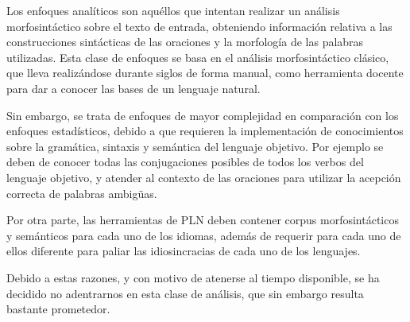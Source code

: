 Los enfoques analíticos son aquéllos que intentan realizar un análisis morfosintáctico sobre el texto de entrada, obteniendo información relativa a las construcciones sintácticas de las oraciones y la morfología de las palabras utilizadas.
%
Esta clase de enfoques se basa en el análisis morfosintáctico clásico, que lleva realizándose durante siglos de forma manual, como herramienta docente para dar a conocer las bases de un lenguaje natural.

Sin embargo, se trata de enfoques de mayor complejidad en comparación con los enfoques estadísticos, debido a que requieren la implementación de conocimientos sobre la gramática, sintaxis y semántica del lenguaje objetivo.
%
Por ejemplo se deben de conocer todas las conjugaciones posibles de todos los verbos del lenguaje objetivo, y atender al contexto de las oraciones para utilizar la acepción correcta de palabras ambigüas.

Por otra parte, las herramientas de PLN deben contener corpus morfosintácticos y semánticos para cada uno de los idiomas, además de requerir para cada uno de ellos diferente para paliar las idiosincracias de cada uno de los lenguajes.

Debido a estas razones, y con motivo de atenerse al tiempo disponible, se ha decidido no adentrarnos en esta clase de análisis, que sin embargo resulta bastante prometedor.